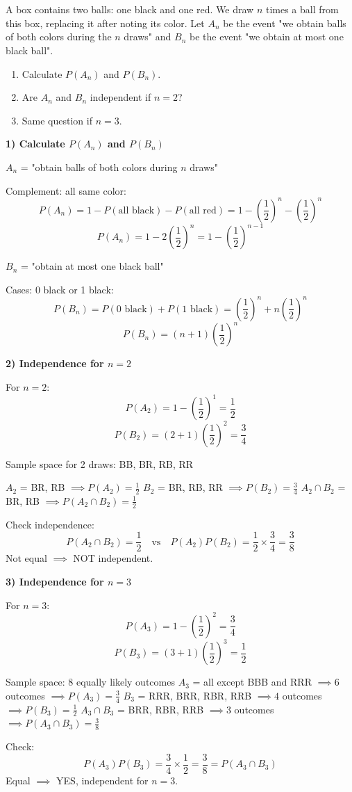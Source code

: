 \documentclass[12pt]{article}
\begin{document}
\section{}
A box contains two balls: one black and one red. We draw $n$ times a ball from this box, replacing it after noting its color. Let $A_n$ be the event "we obtain balls of both colors during the $n$ draws" and $B_n$ be the event "we obtain at most one black ball".

\begin{enumerate}
    \item Calculate $P(A_n)$ and $P(B_n)$.
    \item Are $A_n$ and $B_n$ independent if $n = 2$?
    \item Same question if $n = 3$.
\end{enumerate}

\begin{correctionbox}
\textbf{1) Calculate $P(A_n)$ and $P(B_n)$}

$A_n$ = "obtain balls of both colors during $n$ draws"

Complement: all same color:
\[
P(A_n) = 1 - P(\text{all black}) - P(\text{all red}) = 1 - \left(\frac{1}{2}\right)^n - \left(\frac{1}{2}\right)^n
\]
\[
P(A_n) = 1 - 2\left(\frac{1}{2}\right)^n = 1 - \left(\frac{1}{2}\right)^{n-1}
\]

$B_n$ = "obtain at most one black ball"

Cases: 0 black or 1 black:
\[
P(B_n) = P(\text{0 black}) + P(\text{1 black}) = \left(\frac{1}{2}\right)^n + n\left(\frac{1}{2}\right)^n
\]
\[
P(B_n) = (n + 1)\left(\frac{1}{2}\right)^n
\]

\textbf{2) Independence for $n = 2$}

For $n = 2$:
\[
P(A_2) = 1 - \left(\frac{1}{2}\right)^{1} = \frac{1}{2}
\]
\[
P(B_2) = (2 + 1)\left(\frac{1}{2}\right)^2 = \frac{3}{4}
\]

Sample space for 2 draws: {BB, BR, RB, RR}

$A_2$ = {BR, RB}  $\implies P(A_2) = \frac{1}{2}$
$B_2$ = {BR, RB, RR}  $\implies P(B_2) = \frac{3}{4}$
$A_2 \cap B_2$ = {BR, RB}  $\implies P(A_2 \cap B_2) = \frac{1}{2}$

Check independence:
\[
P(A_2 \cap B_2) = \frac{1}{2} \quad \text{vs} \quad P(A_2)P(B_2) = \frac{1}{2} \times \frac{3}{4} = \frac{3}{8}
\]
Not equal $\implies$ NOT independent.

\textbf{3) Independence for $n = 3$}

For $n = 3$:
\[
P(A_3) = 1 - \left(\frac{1}{2}\right)^{2} = \frac{3}{4}
\]
\[
P(B_3) = (3 + 1)\left(\frac{1}{2}\right)^3 = \frac{1}{2}
\]

Sample space: 8 equally likely outcomes
$A_3$ = all except BBB and RRR  $\implies 6$ outcomes $\implies P(A_3) = \frac{3}{4}$
$B_3$ = {RRR, BRR, RBR, RRB}  $\implies 4$ outcomes $\implies P(B_3) = \frac{1}{2}$
$A_3 \cap B_3$ = {BRR, RBR, RRB}  $\implies 3$ outcomes $\implies P(A_3 \cap B_3) = \frac{3}{8}$

Check:
\[
P(A_3)P(B_3) = \frac{3}{4} \times \frac{1}{2} = \frac{3}{8} = P(A_3 \cap B_3)
\]
Equal $\implies$ YES, independent for $n = 3$.
\end{correctionbox}
\end{document}
